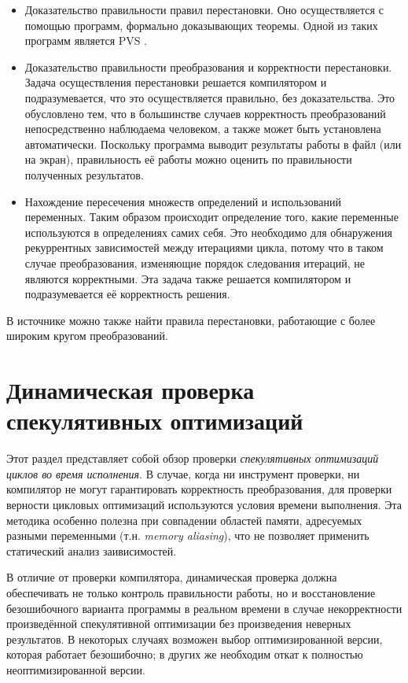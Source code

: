 \begin{itemize}
	\item Доказательство правильности правил перестановки. Оно осуществляется с помощью программ, формально доказывающих теоремы. Одной из таких программ является PVS \cite{SOR93}.
	\item Доказательство правильности преобразования и корректности перестановки. Задача осуществления перестановки решается компилятором и подразумевается, что это осуществляется правильно, без доказательства. Это обусловлено тем, что в большинстве случаев корректность преобразований непосредственно наблюдаема человеком, а также может быть установлена автоматически. Поскольку программа выводит результаты работы в файл (или на экран), правильность её работы можно оценить по правильности полученных результатов.
	\item Нахождение пересечения множеств определений и использований переменных. Таким образом происходит определение того, какие переменные используются в определениях самих себя. Это необходимо для обнаружения рекуррентных зависимостей между итерациями цикла, потому что в таком случае преобразования, изменяющие порядок следования итераций, не являются корректными. Эта задача также решается компилятором и подразумевается её корректность решения.
\end{itemize}

В источнике \cite{ZPL00} можно также найти правила перестановки, работающие с более широким кругом преобразований.

\section{Динамическая проверка спекулятивных оптимизаций}

Этот раздел представляет собой обзор проверки \emph{спекулятивных оптимизаций циклов во время исполнения}. В случае, когда ни инструмент проверки, ни компилятор не могут гарантировать корректность преобразования, для проверки верности цикловых оптимизаций используются условия времени выполнения. Эта методика особенно полезна при совпадении областей памяти, адресуемых разными переменными (т.н. \emph{memory aliasing}), что не позволяет применить статический анализ заивисимостей.

В отличие от проверки компилятора, динамическая проверка должна обеспечивать не только контроль правильности работы, но и восстановление безошибочного варианта программы в реальном времени в случае некорректности произведённой спекулятивной оптимизации без произведения неверных результатов. В некоторых случаях возможен выбор оптимизированной версии, которая работает безошибочно; в других же необходим откат к полностью неоптимизированной версии.

